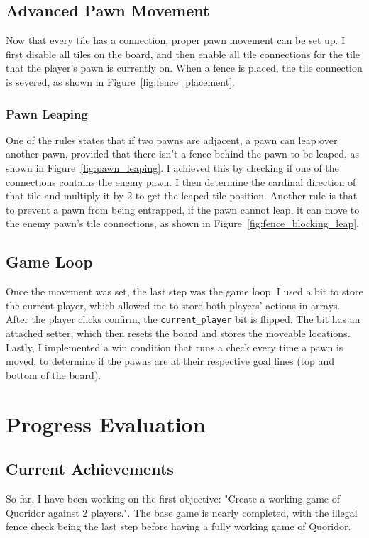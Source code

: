 \documentclass[progress]{cmpreport}
\begin{document}
\subsection{Advanced Pawn Movement}
Now that every tile has a connection, proper pawn movement can be set up. I first disable all tiles on the board, and then enable all tile connections for the tile that the player's pawn is currently on. When a fence is placed, the tile connection is severed, as shown in Figure~\ref{fig:fence_placement}.

\subsubsection{Pawn Leaping}
One of the rules states that if two pawns are adjacent, a pawn can leap over another pawn, provided that there isn't a fence behind the pawn to be leaped, as shown in Figure~\ref{fig:pawn_leaping}. I achieved this by checking if one of the connections contains the enemy pawn. I then determine the cardinal direction of that tile and multiply it by 2 to get the leaped tile position. Another rule is that to prevent a pawn from being entrapped, if the pawn cannot leap, it can move to the enemy pawn's tile connections, as shown in Figure~\ref{fig:fence_blocking_leap}.

\subsection{Game Loop}
Once the movement was set, the last step was the game loop. I used a bit to store the current player, which allowed me to store both players' actions in arrays. After the player clicks confirm, the \texttt{current\_player} bit is flipped. The bit has an attached setter, which then resets the board and stores the moveable locations. Lastly, I implemented a win condition that runs a check every time a pawn is moved, to determine if the pawns are at their respective goal lines (top and bottom of the board).

\section{Progress Evaluation}

\subsection{Current Achievements}
So far, I have been working on the first objective: "Create a working game of Quoridor against 2 players.". The base game is nearly completed, with the illegal fence check being the last step before having a fully working game of Quoridor.
\end{document}
